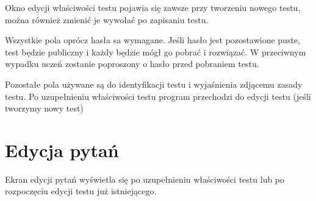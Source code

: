\documentclass[letterpaper,10pt,polish]{sphinxmanual}
\begin{document}
Okno edycji właściwości testu pojawia się zawsze przy tworzeniu nowego testu, można również zmienić je wywołać po zapisaniu testu.

Wszystkie pola oprócz hasła sa wymagane. Jeśli hasło jest pozostawione puste, test będzie publiczny i każdy będzie mógł go pobrać i rozwiązać. W przeciwnym wypadku uczeń zostanie poproszony o hasło przed pobraniem testu.

Pozostałe pola używane są do identyfikacji testu i wyjaśnienia zdjącemu zasady testu.
Po uzupełnieniu właściwości testu program przechodzi do edycji testu (jeśli tworzymy nowy test)


\section{Edycja pytań}
\label{index:id6}\label{index:edycja-pytan}
Ekran edycji pytań wyświetla się po uzupełnieniu właściwości testu lub po rozpoczęciu edycji testu już istniejącego.
\end{document}
